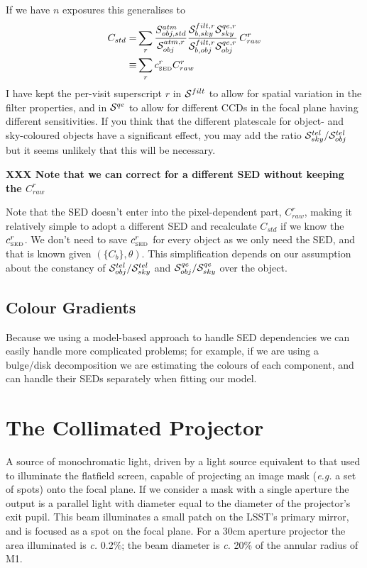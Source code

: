 \documentclass[12pt]{article}
\renewcommand{\c}{\textit{c.}\xspace}
\newcommand{\eg}{\textit{e.g.}\xspace}
\newcommand{\qe}{{\cal S}}
\newcommand{\XXX}[1]{\textbf{XXX #1}\xspace}
\begin{document}
\newcommand{\cSED}{c_{\scriptscriptstyle\rm SED}}

If we have $n$ exposures this generalises to
\begin{align*}
C_{std}  =& \sum_r
    \frac{S_{obj,std}^{atm}}{\qe_{obj}^{atm,r}}
    \frac{\qe_{b, sky}^{filt,r} \qe_{sky}^{qe,r}}
         {\qe_{b, obj}^{filt,r} \qe_{obj}^{qe,r}}
    \, C_{raw}^r\\
 \equiv& \sum_r \cSED^r C_{raw}^r
\end{align*}
I have kept the per-visit superscript $r$ in $\qe^{filt}$ to allow for spatial variation in the filter
properties, and in $\qe^{qe}$ to allow for different CCDs in the focal plane having different sensitivities.
If you think that the different platescale for object- and sky-coloured objects have a significant effect, you
may add the ratio $\qe_{sky}^{tel}/\qe_{obj}^{tel}$ but it seems unlikely that this will be necessary.

\XXX{Note that we can correct for a different SED without keeping the $C_{raw}^r$}

Note that the SED doesn't enter into the pixel-dependent part, $C_{raw}^r$, making it relatively simple to
adopt a different SED and recalculate $C_{std}$ if we know the $\cSED^r$.  We don't need to save $\cSED^r$
for every object as we only need the SED, and that is known given $(\{C_b\}, \theta)$.  This simplification
depends on our assumption about the constancy of  $\qe_{obj}^{tel}/\qe_{sky}^{tel}$ and
$\qe_{obj}^{qe}/\qe_{sky}^{qe}$ over the object.

\subsection{Colour Gradients}

Because we using a model-based approach to handle SED dependencies we can easily handle more complicated
problems; for example, if we are using a bulge/disk decomposition we are estimating the colours of each
component, and can handle their SEDs separately when fitting our model.

\appendix

\section{The Collimated Projector}
\label{appProjector}

A source of monochromatic light, driven by a light source equivalent to that used to illuminate the flatfield
screen, capable of projecting an image mask (\eg a set of spots) onto the focal plane.  If we consider a mask
with a single aperture the output is a parallel light with diameter equal to the diameter of the projector's
exit pupil.  This beam illuminates a small patch on the LSST's primary mirror, and is focused as a spot on the
focal plane.  For a 30cm aperture projector the area illuminated is \c 0.2\%; the beam diameter is \c 20\%
of the annular radius of M1.
\end{document}
